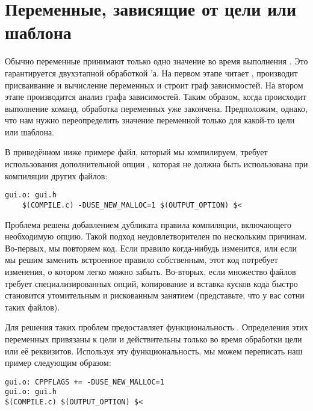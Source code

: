 \section{Переменные, зависящие от цели или шаблона}

Обычно переменные принимают только одно значение во время выполнения
\GNUmake{}. Это гарантируется двухэтапной обработкой \Makefile{}'а.
На первом этапе \GNUmake{} читает \Makefile{}, производит присваивание
и вычисление переменных и строит граф зависимостей. На втором этапе
производится анализ графа зависимостей. Таким образом, когда происходит
выполнение команд, обработка переменных уже закончена. Предположим,
однако, что нам нужно переопределить значение переменной только для
какой-то цели или шаблона.

В приведённом ниже примере файл, который мы компилируем, требует
использования дополнительной опции ,
которая не должна быть использована при компиляции других файлов:

{\footnotesize
\begin{verbatim}
gui.o: gui.h
    $(COMPILE.c) -DUSE_NEW_MALLOC=1 $(OUTPUT_OPTION) $<
\end{verbatim}
}

Проблема решена добавлением дубликата правила компиляции, включающего
необходимую опцию. Такой подход неудовлетворителен по нескольким
причинам. Во-первых, мы повторяем код. Если правило когда-нибудь
изменится, или если мы решим заменить встроенное правило собственным,
этот код потребует изменения, о котором легко можно забыть. Во-вторых,
если множество файлов требует специализированных опций, копирование и
вставка кусков кода быстро становится утомительным и рискованным
занятием (представьте, что у вас сотни таких файлов).

Для решения таких проблем \GNUmake{} предоставляет функциональность
. Определения этих переменных
привязаны к цели и действительны только во время обработки цели или её
реквизитов. Используя эту функциональность, мы можем переписать наш
пример следующим образом:

{\footnotesize
\begin{verbatim}
gui.o: CPPFLAGS += -DUSE_NEW_MALLOC=1
gui.o: gui.h
$(COMPILE.c) $(OUTPUT_OPTION) $<
\end{verbatim}
}

